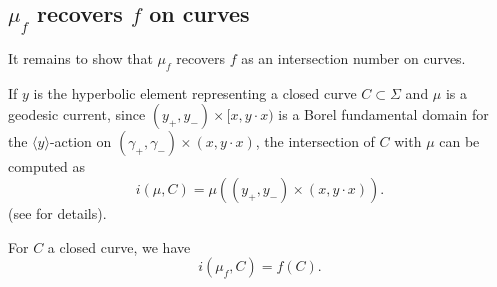 \subsection{$\mu_{f}$ recovers $f$ on curves}
\label{sec:recovery}

It remains to show that $\mu_f$ recovers $f$ as an intersection number on curves.

If $y$ is the hyperbolic element representing a closed curve $C \subset \Sigma$ and $\mu$ is a geodesic current, since $(y_+,y_-) \times [x,y \cdot x)$ is a Borel fundamental domain for the $\langle y \rangle$-action on
$(\gamma_+,\gamma_-) \times (x,y \cdot x)$, the intersection of $C$ with $\mu$ can be computed as
\[
i(\mu, C) = \mu((y_+,y_-) \times (x,y \cdot x)).
\]
(see \cite[Lemma~4.4]{MZ19:PositivelyRatioed} for details).

\begin{proposition}
For $C$ a closed curve, we have
\[
i(\mu_f,C)=f(C).
\]
\label{prop:recoverintersection}
\end{proposition}
